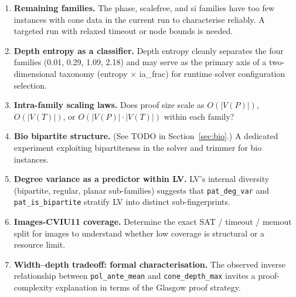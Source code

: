 \documentclass[11pt,a4paper]{article}
\begin{document}
\begin{enumerate}
  \item \textbf{Remaining families.}
    The phase, scalefree, and si families have too few instances with cone data in the current run
    to characterise reliably.
    A targeted run with relaxed timeout or node bounds is needed.

  \item \textbf{Depth entropy as a classifier.}
    Depth entropy cleanly separates the four families (0.01, 0.29, 1.09, 2.18) and may serve
    as the primary axis of a two-dimensional taxonomy (entropy $\times$ ia\_frac) for runtime
    solver configuration selection.

  \item \textbf{Intra-family scaling laws.}
    Does proof size scale as $O(|V(P)|)$, $O(|V(T)|)$, or $O(|V(P)| \cdot |V(T)|)$ within each
    family?

  \item \textbf{Bio bipartite structure.}
    (See TODO in Section~\ref{sec:bio}.)
    A dedicated experiment exploiting bipartiteness in the solver and trimmer for bio instances.

  \item \textbf{Degree variance as a predictor within LV.}
    LV's internal diversity (bipartite, regular, planar sub-families) suggests that
    \texttt{pat\_deg\_var} and \texttt{pat\_is\_bipartite} stratify LV into distinct
    sub-fingerprints.

  \item \textbf{Images-CVIU11 coverage.}
    Determine the exact SAT / timeout / memout split for images to understand whether
    low coverage is structural or a resource limit.

  \item \textbf{Width--depth tradeoff: formal characterisation.}
    The observed inverse relationship between \texttt{pol\_ante\_mean} and
    \texttt{cone\_depth\_max} invites a proof-complexity explanation in terms of the Glasgow
    proof strategy.
\end{enumerate}



\end{document}
